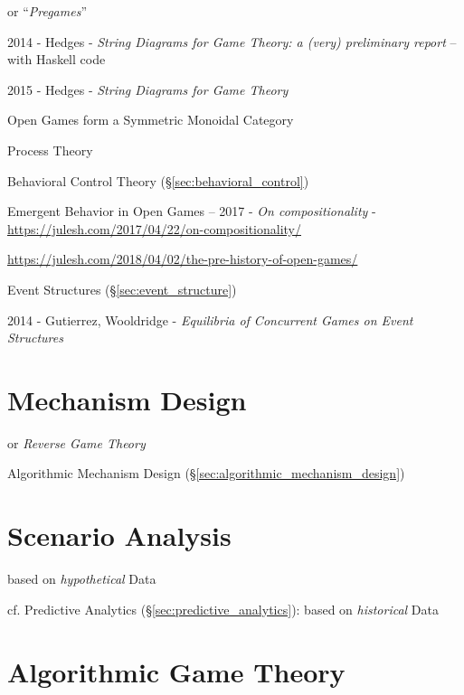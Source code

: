 or ``\emph{Pregames}''

2014 - Hedges - \emph{String Diagrams for Game Theory: a (very) preliminary
  report} -- with Haskell code

2015 - Hedges - \emph{String Diagrams for Game Theory}

Open Games form a Symmetric Monoidal Category

Process Theory

Behavioral Control Theory (\S\ref{sec:behavioral_control})

Emergent Behavior in Open Games --
2017 - \emph{On compositionality} -
\url{https://julesh.com/2017/04/22/on-compositionality/}

\url{https://julesh.com/2018/04/02/the-pre-history-of-open-games/}

Event Structures (\S\ref{sec:event_structure})

2014 - Gutierrez, Wooldridge - \emph{Equilibria of Concurrent Games on Event
  Structures}



\section{Mechanism Design}\label{sec:mechanism_design}

or \emph{Reverse Game Theory}

Algorithmic Mechanism Design (\S\ref{sec:algorithmic_mechanism_design})



\section{Scenario Analysis}\label{sec:scenario_analysis}

based on \emph{hypothetical} Data

cf. Predictive Analytics (\S\ref{sec:predictive_analytics}): based on
\emph{historical} Data



\section{Algorithmic Game Theory}\label{sec:algorithmic_game_theory}

